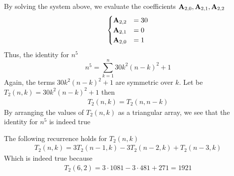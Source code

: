 By solving the system above, we evaluate the coefficients ${\mathbf{A}} \sb{2,0}, {\mathbf{A}} \sb{2,1}, {\mathbf{A}} \sb{2,2}$
\begin{equation*}
    \begin{cases}
        {\mathbf{A}} \sb{2,2} &= 30 \\
        {\mathbf{A}} \sb{2,1} &= 0 \\
        {\mathbf{A}} \sb{2,0} &= 1
    \end{cases}
\end{equation*}
Thus, the identity for $n^5$
\begin{equation*}
    n^5 = \sum_{k=1}^{n} 30k^2(n-k)^2 + 1
\end{equation*}
Again, the terms $30k^2(n-k)^2 + 1$ are symmetric over $k$.
Let be $T_2 (n,k) = 30k^2(n-k)^2 + 1$ then
\begin{align*}
    T_2 (n,k) = T_2 (n,n-k)
\end{align*}
By arranging the values of $T_{2} (n,k)$ as a triangular array, we see that the identity for $n^5$ is indeed true

The following recurrence holds for $T_2 (n,k)$
\begin{align*}
    T_2 (n, k) = 3T_2(n-1, k) - 3T_2(n-2, k) + T_2(n-3, k)
\end{align*}
Which is indeed true because
\begin{align*}
    T_2 (6,2) = 3 \cdot 1081 - 3 \cdot 481 + 271 = 1921
\end{align*}

